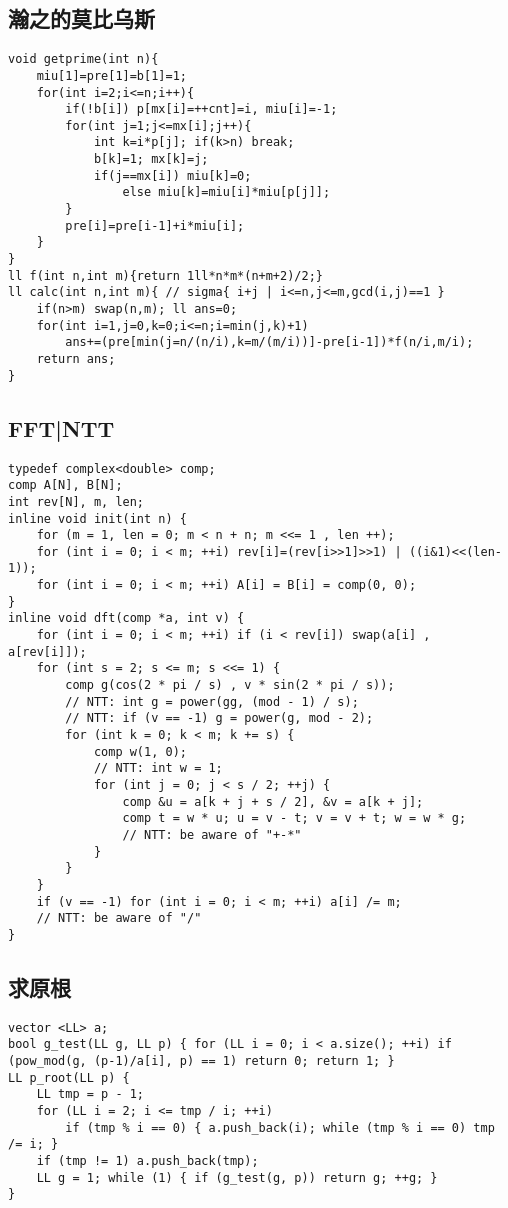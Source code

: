 \documentclass[landscape,a4paper]{article}
\begin{document}
\subsection{瀚之的莫比乌斯}
\begin{lstlisting}
void getprime(int n){
	miu[1]=pre[1]=b[1]=1;
	for(int i=2;i<=n;i++){
		if(!b[i]) p[mx[i]=++cnt]=i, miu[i]=-1;
		for(int j=1;j<=mx[i];j++){
			int k=i*p[j]; if(k>n) break;
			b[k]=1; mx[k]=j;
			if(j==mx[i]) miu[k]=0;
				else miu[k]=miu[i]*miu[p[j]];
		}
		pre[i]=pre[i-1]+i*miu[i];
	}
}
ll f(int n,int m){return 1ll*n*m*(n+m+2)/2;} 
ll calc(int n,int m){ // sigma{ i+j | i<=n,j<=m,gcd(i,j)==1 }
	if(n>m) swap(n,m); ll ans=0;
	for(int i=1,j=0,k=0;i<=n;i=min(j,k)+1)
		ans+=(pre[min(j=n/(n/i),k=m/(m/i))]-pre[i-1])*f(n/i,m/i);
	return ans;
}
\end{lstlisting}

\subsection{FFT|NTT}

\begin{lstlisting}
typedef complex<double> comp;
comp A[N], B[N];
int rev[N], m, len;
inline void init(int n) {
	for (m = 1, len = 0; m < n + n; m <<= 1 , len ++);
	for (int i = 0; i < m; ++i) rev[i]=(rev[i>>1]>>1) | ((i&1)<<(len-1));
	for (int i = 0; i < m; ++i) A[i] = B[i] = comp(0, 0);
}
inline void dft(comp *a, int v) {
	for (int i = 0; i < m; ++i) if (i < rev[i]) swap(a[i] , a[rev[i]]);
	for (int s = 2; s <= m; s <<= 1) {
		comp g(cos(2 * pi / s) , v * sin(2 * pi / s));
		// NTT: int g = power(gg, (mod - 1) / s);
		// NTT: if (v == -1) g = power(g, mod - 2);
		for (int k = 0; k < m; k += s) {
			comp w(1, 0);
			// NTT: int w = 1;
			for (int j = 0; j < s / 2; ++j) {
				comp &u = a[k + j + s / 2], &v = a[k + j];
				comp t = w * u; u = v - t; v = v + t; w = w * g;
				// NTT: be aware of "+-*"
			}
		}
	}
	if (v == -1) for (int i = 0; i < m; ++i) a[i] /= m;
	// NTT: be aware of "/"
}
\end{lstlisting}

\subsection{求原根}
\begin{lstlisting}
vector <LL> a;
bool g_test(LL g, LL p) { for (LL i = 0; i < a.size(); ++i) if (pow_mod(g, (p-1)/a[i], p) == 1) return 0; return 1; }
LL p_root(LL p) {
	LL tmp = p - 1;
	for (LL i = 2; i <= tmp / i; ++i)
		if (tmp % i == 0) { a.push_back(i); while (tmp % i == 0) tmp /= i; }
	if (tmp != 1) a.push_back(tmp);
	LL g = 1; while (1) { if (g_test(g, p)) return g; ++g; }
}
\end{lstlisting}
\end{document}
